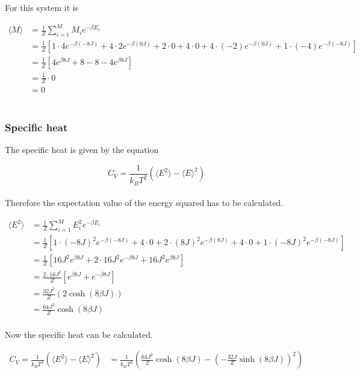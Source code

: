 \documentclass{article}
\begin{document}
For this system it is

\begin{align*}
  \langle M \rangle &= \frac{1}{Z} \sum _{i=1} ^M M_i e^{- \beta E_i} \\
  &= \frac{1}{Z} \left[1 \cdot 4 e^{- \beta (-8J)} + 4 \cdot 2 e^{- \beta (0J)} + 2 \cdot 0 + 4 \cdot 0 + 4 \cdot (-2) e^{- \beta (0J)} + 1 \cdot (-4) e^{- \beta (-8J)} \right] \\
  &= \frac{1}{Z} \left[ 4 e^{\beta 8J} + 8 - 8 - 4 e^{ \beta 8J} \right] \\
  &= \frac{1}{Z} \cdot 0 \\
  &= 0
\end{align*} \\


\subsubsection{Specific heat}

The specific heat is given by the equation

\begin{equation}    \label{eq:specificheat}
    C_V = \frac{1}{k_B T^2} \left( \langle E^2 \rangle - \langle E \rangle ^2 \right)
\end{equation} \\

Therefore the expectation value of the energy squared has to be calculated.

\begin{align*}
  \langle E^2 \rangle &= \frac{1}{Z} \sum _{i=1} ^M E_i^2 e^{- \beta E_i} \\
  &= \frac{1}{Z} \left[ 1 \cdot (-8J)^2 e^{- \beta (-8J)} + 4 \cdot 0 + 2 \cdot (8J)^2 e^{- \beta (8J)} + 4 \cdot 0 + 1 \cdot (-8J)^2 e^{- \beta (-8J)} \right] \\
  &= \frac{1}{Z} \left[ 16 J^2 e^{\beta 8J} + 2 \cdot 16 J^2 e^{- \beta 8J} + 16 J^2 e^{ \beta 8J} \right] \\
  &= \frac{2 \cdot 16 J^2}{Z} \left[ e^{\beta 8 J} + e^{- \beta 8 J} \right] \\
  &= \frac{32 J^2}{Z} (2 \cosh(8 \beta J) ) \\
  &= \frac{64 J^2}{Z} \cosh(8 \beta J)
\end{align*} \\

Now the specific heat can be calculated.

\begin{align*}
    C_V = \frac{1}{k_B T^2} \left( \langle E^2 \rangle - \langle E \rangle ^2 \right)
    &= \frac{1}{k_B T^2} \left( \frac{64 J^2}{Z} \cosh (8 \beta J) - \left( - \frac{32 J}{Z} \sinh(8 \beta J ) \right) ^2 \right)
\end{align*} \\
\end{document}
